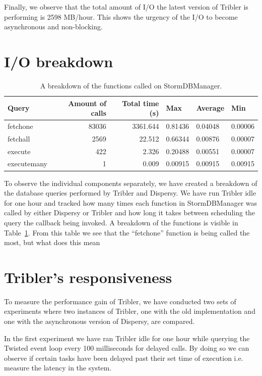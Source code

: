 Finally, we observe that the total amount of I/O the latest version of Tribler is performing is 2598 MB/hour.
This shows the urgency of the I/O to become asynchronous and non-blocking.

\section{I/O breakdown}

\begin{table}[]
	\centering
	\caption{A breakdown of the functions called on StormDBManager.}
	\label{table:breakdown_tribler_idle}
	\begin{tabular}{|l|r|r|l|l|l|}
		\hline
		\textbf{Query}	& \textbf{Amount of calls} & \textbf{Total time (s)} & \textbf{Max}  & \textbf{Average} & \textbf{Min} \\ \hline
		fetchone	& 83036	& 3361.644 	& 0.81436	& 0.04048	& 0.00006 \\ \hline
		fetchall	& 2569	& 22.512	& 0.66344	& 0.00876	& 0.00007 \\ \hline
		execute		& 422	& 2.326  	& 0.20488	& 0.00551	& 0.00007 \\ \hline
		executemany	& 1		& 0.009 	& 0.00915 	& 0.00915	& 0.00915 \\ \hline
	\end{tabular}
\end{table}

To observe the individual components separately, we have created a breakdown of the database queries performed by Tribler and Dispersy.
We have run Tribler idle for one hour and tracked how many times each function in StormDBManager was called by either Dispersy or Tribler and how long it takes between scheduling the query the callback being invoked.
A breakdown of the functions is visible in Table~\ref{table:breakdown_tribler_idle}.
From this table we see that the \enquote{fetchone} function is being called the most, but what does this mean

\section{Tribler's responsiveness}

To measure the performance gain of Tribler, we have conducted two sets of experiments where two instances of Tribler, one with the old implementation and one with the asynchronous version of Dispersy, are compared.

In the first experiment we have ran Tribler idle for one hour while querying the Twisted event loop every 100 milliseconds for delayed calls.
By doing so we can observe if certain tasks have been delayed past their set time of execution i.e. measure the latency in the system.


